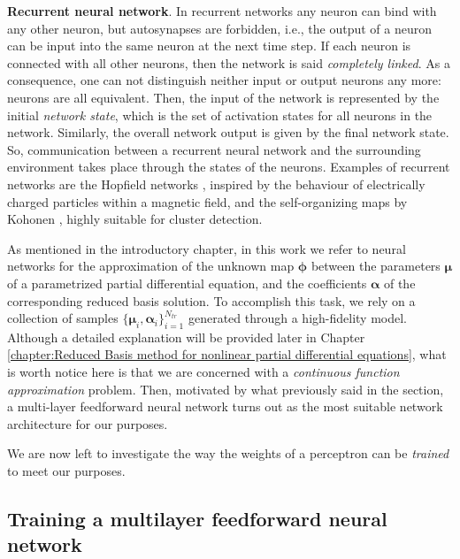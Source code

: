 \documentclass[12pt, a4paper, twoside, openright]{report}
\numberwithin{equation}{chapter}
\theoremstyle{theorem}
\theoremstyle{definition}
\theoremstyle{remark}
\theoremstyle{proposition}
\numberwithin{figure}{chapter}
\begin{document}
		\noindent \textbf{Recurrent neural network}. In recurrent networks any neuron can bind with any other neuron, but autosynapses are forbidden, i.e., the output of a neuron can be input into the same neuron at the next time step. If each neuron is connected with all other neurons, then the network is said \emph{completely linked}. As a consequence, one can not distinguish neither input or output neurons any more: neurons are all equivalent. Then, the input of the network is represented by the initial \emph{network state}, which is the set of activation states for all neurons in the network. Similarly, the overall network output is given by the final network state. So, communication between a recurrent neural network and the surrounding environment takes place through the states of the neurons. Examples of recurrent networks are the Hopfield networks \cite{Hop82}, inspired by the behaviour of electrically charged particles within a magnetic field, and the self-organizing maps by Kohonen \cite{Koh98}, highly suitable for cluster detection.
		
		\vspace*{0.3cm}
		
		As mentioned in the introductory chapter, in this work we refer to neural networks for the approximation of the unknown map $\boldsymbol{\phi}$ between the parameters $\boldsymbol{\mu}$ of a parametrized partial differential equation, and the coefficients $\boldsymbol{\alpha}$ of the corresponding reduced basis solution. To accomplish this task, we rely on a collection of samples $\big\lbrace \boldsymbol{\mu}_i, \boldsymbol{\alpha}_i \big\rbrace_{i = 1}^{N_{tr}}$ generated through a high-fidelity model. Although a detailed explanation will be provided later in Chapter \ref{chapter:Reduced Basis method for nonlinear partial differential equations}, what is worth notice here is that we are concerned with a \emph{continuous function approximation} problem. Then, motivated by what previously said in the section, a multi-layer feedforward neural network turns out as the most suitable network architecture for our purposes. 
		
		We are now left to investigate the way the weights of a perceptron can be \emph{trained} to meet our purposes.
		
	\vspace*{0.3cm}
		
	\subsection{Training a multilayer feedforward neural network}
	\label{section:Training a multilayer feedforard neural network}
	
\end{document}
